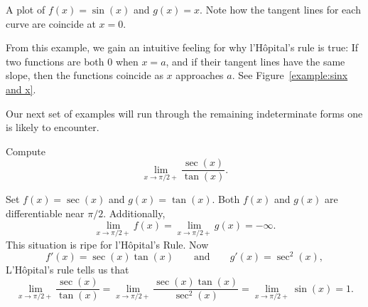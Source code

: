 \begin{marginfigure}[-1in]
\caption{A plot of $f(x)=\sin(x)$ and $g(x) = x$. Note how the tangent
  lines for each curve are coincide at $x=0$.}
\label{example:sinx and x}
\end{marginfigure}


From this example, we gain an intuitive feeling for why l'H\^opital's
rule is true: If two functions are both $0$ when $x=a$, and if their
tangent lines have the same slope, then the functions coincide as $x$
approaches $a$. See Figure~\ref{example:sinx and x}. 




Our next set of examples will run through the remaining indeterminate
forms one is likely to encounter.

\begin{example}[$\pmb\infty$/$\pmb\infty$] Compute 
\[
\lim_{x\to \pi/2+} \frac{\sec(x)}{\tan(x)}.
\]
\end{example}

\begin{solution}
Set $f(x) = \sec(x)$ and $g(x) = \tan(x)$. Both $f(x)$ and $g(x)$
are differentiable near $\pi/2$. Additionally,
\[
\lim_{x \to \pi/2+} f(x) = \lim_{x \to \pi/2+}g(x) = -\infty.
\]
This situation is ripe for l'H\^opital's Rule. Now 
\[
f'(x) = \sec(x)\tan(x) \qquad\text{and}\qquad g'(x) = \sec^2(x), 
\]
L'H\^opital's rule tells us that 
\[
\lim_{x\to \pi/2+} \frac{\sec(x)}{\tan(x)} = \lim_{x\to \pi/2+}
\frac{\sec(x)\tan(x)}{\sec^2(x)} = \lim_{x\to \pi/2+} \sin(x) =
1.
\]
\end{solution}



